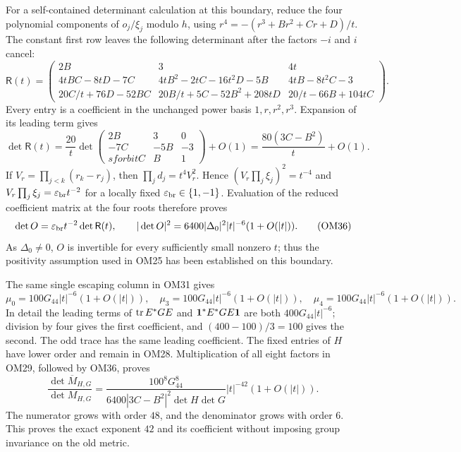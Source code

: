 \documentclass[11pt]{article}
\begin{document}
For a self-contained determinant calculation at this boundary,
reduce the four polynomial components of $o_j/\xi_j$ modulo
$h$, using $r^4=-(r^3+Br^2+Cr+D)/t$.
The constant first row leaves the following determinant after
the factors $-i$ and $i$ cancel:
\[
\mathsf R(t)=\begin{pmatrix}
2B&3&4t\\
4tBC-8tD-7C&4tB^2-2tC-16t^2D-5B&4tB-8t^2C-3\\
20C/t+76D-52BC&20B/t+5C-52B^2+208tD&20/t-66B+104tC
\end{pmatrix}.
\tag{OM34}
\]
Every entry is a coefficient in the unchanged power basis
$1,r,r^2,r^3$.  Expansion of its leading term gives
\[
\det\mathsf R(t)
=\frac{20}{t}
\det\begin{pmatrix}2B&3&0\\-7C&-5B&-3\\sforbitC&B&1\end{pmatrix}
 +O(1)
=\frac{80(3C-B^2)}t+O(1).
\tag{OM35}
\]
If $V_r=\prod_{j<k}(r_k-r_j)$, then
$\prod_jd_j=t^4V_r^2$.  Hence
$(V_r\prod_j\xi_j)^2=t^{-4}$ and
$V_r\prod_j\xi_j=\varepsilon_{\rm br}t^{-2}$ for a locally fixed
$\varepsilon_{\rm br}\in\{1,-1\}$.  Evaluation of the reduced
coefficient matrix at the four roots therefore proves
\[
\det O=\varepsilon_{\rm br}t^{-2}\det\mathsf R(t),\qquad
|\det O|^2=6400|\Delta_0|^2|t|^{-6}(1+O(|t|)).
\tag{OM36}
\]
As $\Delta_0\ne0$, $O$ is invertible for every sufficiently small
nonzero $t$; thus the positivity assumption used in OM25 has
been established on this boundary.

The same single escaping column in OM31 gives
\[
\mu_0=100G_{44}|t|^{-6}(1+O(|t|)),\quad
\mu_3=100G_{44}|t|^{-6}(1+O(|t|)),\quad
\mu_4=100G_{44}|t|^{-6}(1+O(|t|)).
\tag{OM37}
\]
In detail the leading terms of $\operatorname{tr} E^*GE$ and
$\mathbf 1^*E^*GE\mathbf 1$ are both $400G_{44}|t|^{-6}$;
division by four gives the first coefficient, and
$(400-100)/3=100$ gives the second.
The odd trace has the same leading coefficient.  The fixed
entries of $H$ have lower order and remain in OM28.
Multiplication of all eight factors in OM29, followed by OM36,
proves
\[
\boxed{\frac{\det\overline M_{H,G}}{\det M_{H,G}}
=\frac{100^8G_{44}^8}
 {6400|3C-B^2|^2\det H\det G}
 |t|^{-42}(1+O(|t|)).}
\tag{OM38}
\]
The numerator grows with order $48$, and the denominator grows
with order $6$.  This proves the exact exponent $42$ and its
coefficient without imposing group invariance on the old metric.
\end{document}
